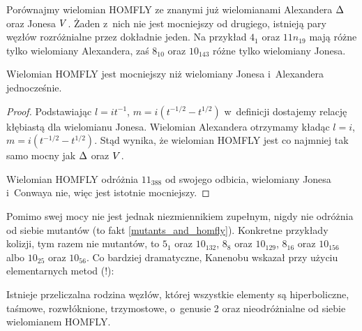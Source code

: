 Porównajmy wielomian HOMFLY ze znanymi już wielomianami Alexandera $\Delta$ oraz Jonesa $V$.
Żaden z~nich nie jest mocniejszy od drugiego, istnieją pary węzłów rozróżnialne przez dokładnie jeden.
Na przykład $4_1$ oraz $11n_{19}$ mają różne tylko wielomiany Alexandera, zaś $8_{10}$ oraz $10_{143}$ różne tylko wielomiany Jonesa.

\begin{proposition}
\label{homfly_stronger}%
    Wielomian HOMFLY jest mocniejszy niż wielomiany Jonesa i~Alexandera jednocześnie.
\end{proposition}

\begin{proof}
    Podstawiając $l = it^{-1}$, $m = i(t^{-1/2} - t^{1/2})$ w~definicji dostajemy relację kłębiastą dla wielomianu Jonesa.
    Wielomian Alexandera otrzymamy kładąc $l = i$, $m = i(t^{-1/2} - t^{1/2})$.
    Stąd wynika, że wielomian HOMFLY jest co najmniej tak samo mocny jak $\Delta$ oraz $V$.

    Wielomian HOMFLY odróżnia $11_{388}$ od swojego odbicia, wielomiany Jonesa i~Conwaya nie, więc jest istotnie mocniejszy.
\end{proof}

Pomimo swej mocy nie jest jednak niezmiennikiem zupełnym, nigdy nie odróżnia od siebie mutantów (to fakt \ref{mutants_and_homfly}).
%
Konkretne przykłady kolizji, tym razem nie mutantów, to $5_1$ oraz $10_{132}$, $8_{8}$ oraz $10_{129}$, $8_{16}$ oraz $10_{156}$ albo $10_{25}$ oraz $10_{56}$.
Co bardziej dramatyczne, Kanenobu \cite{kanenobu1986} wskazał przy użyciu elementarnych metod (!):
%

\begin{proposition}
%
%
%
%
%
    Istnieje przeliczalna rodzina węzłów, której wszystkie elementy są hiperboliczne, taśmowe, rozwłóknione, trzymostowe, o~genusie 2 oraz nieodróżnialne od siebie wielomianem HOMFLY.
\end{proposition}

